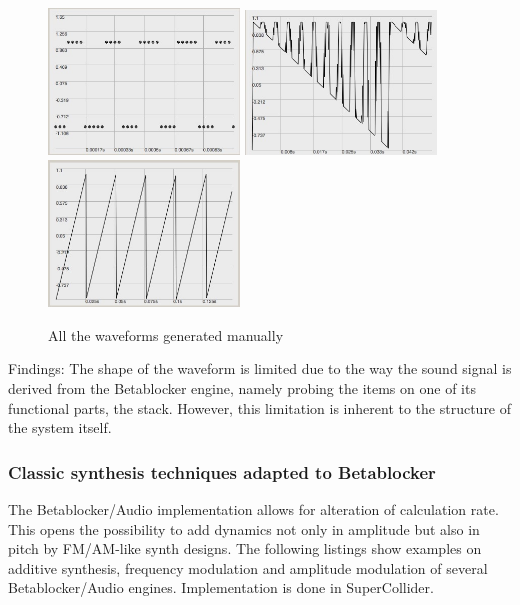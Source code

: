 \documentclass[letterpaper, 12pt]{article}
\begin{document}
\begin{figure}
		\includegraphics[width=2in]{wv-pulse22}
		\includegraphics[width=2in]{wv-sawImpulse}
		\includegraphics[width=2in]{wv-sawtooth}
	\caption{All the waveforms generated manually}
	\label{fig:fig_waveforms_POPdestroy-random}
\end{figure}


Findings: The shape of the waveform is limited due to the way the sound signal is derived from the Betablocker engine, namely probing the items on one of its functional parts, the stack. 
However, this limitation is inherent to the structure of the system itself.





\subsubsection{Classic synthesis techniques adapted to Betablocker} %
\label{sub:classic_synthesis_techniques_adapted_to_betablocker}

The Betablocker/Audio implementation allows for alteration of calculation rate. 
This opens the possibility to add dynamics not only in amplitude but also in pitch by FM/AM-like synth designs.
The following listings show examples on additive synthesis, frequency modulation and amplitude modulation of several Betablocker/Audio engines.
Implementation is done in SuperCollider.
\end{document}
